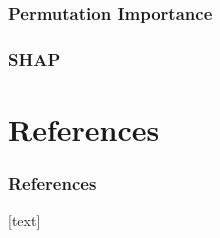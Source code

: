 \documentclass[10pt]{beamer}
\begin{document}
\subsubsection{Permutation Importance}

\subsubsection{SHAP}

\section{References}

\begin{frame}[t, allowframebreaks]
\frametitle{References}
\footnotesize{
[text]

 
}
\end{frame}
\end{document}
